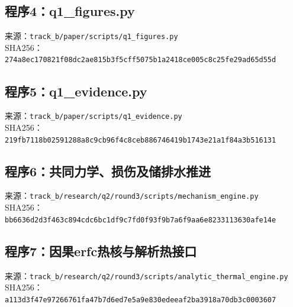 \subsection*{程序4：q1\_figures.py}
\noindent 来源：\nolinkurl{track_b/paper/scripts/q1_figures.py}\\
\noindent SHA256：\texttt{274a8ec170821f08dc2ae815b3f5cff5}\allowbreak\texttt{075b1a2418ce005c8c25fe29ad65d55d}\\
\clearpage
\subsection*{程序5：q1\_evidence.py}
\noindent 来源：\nolinkurl{track_b/paper/scripts/q1_evidence.py}\\
\noindent SHA256：\texttt{219fb7118b02591288a8c9cb96f4c8ce}\allowbreak\texttt{b886746419b1743e21a1f84a3b516131}\\
\clearpage
\subsection*{程序6：共同力学、损伤及储排水推进}
\noindent 来源：\nolinkurl{track_b/research/q2/round3/scripts/mechanism_engine.py}\\
\noindent SHA256：\texttt{bb6636d2d3f463c894cdc6bc1df9c7fd}\allowbreak\texttt{0f93f9b7a6f9aa6e8233113630afe14e}\\
\clearpage
\subsection*{程序7：因果erfc热核与解析热接口}
\noindent 来源：\nolinkurl{track_b/research/q2/round3/scripts/analytic_thermal_engine.py}\\
\noindent SHA256：\texttt{a113d3f47e97266761fa47b7d6ed7e5a}\allowbreak\texttt{9e830edeeaf2ba3918a70db3c0003607}\\
\clearpage
